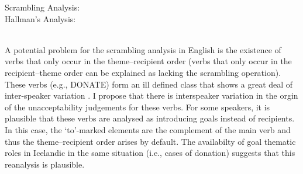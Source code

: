 \begin{exe}
\ex \label{ex:comparison-trees}
\begin{xlist}
\ex Scrambling Analysis: \\
 \ex\label{ex:hallman-tree} Hallman's Analysis: \\
\\
\end{xlist}
\end{exe}%

A potential problem for the scrambling analysis in English is the existence of verbs that only occur in the theme--recipient order (verbs that only occur in the recipient--theme order can be explained as lacking the scrambling operation). These verbs (e.g., DONATE) form an ill defined class that shows a great deal of inter-speaker variation \citep{Levin.1993}. I propose that there is interspeaker variation in the orgin of the unacceptability judgements for these verbs. For some speakers, it is plausible that these verbs are analysed as introducing goals instead of recipients. In this case, the `to'-marked elements are the complement of the main verb and thus the theme--recipient order arises by default. The availabilty of goal thematic roles in Icelandic in the same situation (i.e., cases of donation) suggests that this reanalysis is plausible.

